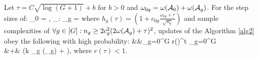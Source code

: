 \begin{theorem}
	\label{theo:step}		
	Let $\tau = C\sqrt{\log(G+1)} + b$ for $b > 0$ and $\omega_{0g} = \omega(\cA_0) + \omega(\cA_g)$. For the step sizes of:
	\be
	\nr
	\mu_0 =  ,
	\forall \in [G]_\setminus: \mu_g =   
	\ee
	where $h_g(\tau) = \left(1 + c_{0g} \frac{\omega_{0g}+ \tau}{\sqrt{n_g}}\right)$
	and sample complexities of $\forall g \in [G]: n_g \geq 2c_g^2 (2 \omega(\cA_g) + \tau)^2$,
	updates of the Algorithm \ref{alg2} obey the following with high probability: %
	\be
	\nr
	&&\sum_{g=0}^{G}  
	\leq r(\tau)^t \sum_{g=0}^{G}     \\ \nr
	&+&   \left(\zeta k \max_{g \in [G]} \omega(\cA_g) + \tau \right),
	\ee
	where $r(\tau) < 1$.%
	
\end{theorem}

